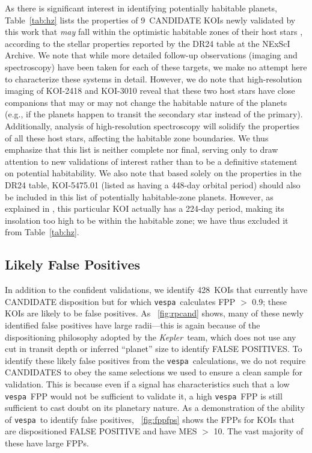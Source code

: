 \documentclass{emulateapj}
\newcommand{\figref}[1]{\ref{fig:#1}}
\newcommand{\Fig}[1]{\figurename~\figref{#1}}
\newcommand{\Tab}[1]{Table~\ref{tab:#1}}
\newcommand{\tab}[1]{\Tab{#1}}
\newcommand{\nfpnew}{428}  %
\newcommand{\nhz}{9}
\newcommand{\kepler}{\textit{Kepler}}
\newcommand{\vespa}{\texttt{vespa}}
\begin{document}


As there is significant interest in identifying potentially habitable
planets, \tab{hz} lists the properties of \nhz\ CANDIDATE KOIs newly
validated by this work that \textit{may} fall within the optimistic
habitable zones of their host stars \citep{Kopparapu:2013}, 
according to the stellar
properties reported by the DR24 table at the NExScI Archive.  We note
that while more detailed follow-up observations (imaging and
spectroscopy) have been taken for each of these targets, we make no
attempt here to characterize these systems in detail.  However, 
we do note that high-resolution imaging of KOI-2418 and KOI-3010 reveal
that these two host stars have close companions that may or may not
change the habitable nature of the planets (e.g., if the planets happen
to transit the secondary star instead of the primary).  Additionally, analysis of
high-resolution spectroscopy will solidify the
properties of all these host stars, affecting the habitable zone
boundaries.  We thus emphasize that this list is neither complete nor
final, serving only to draw attention to new validations of 
interest rather than to be a definitive statement on potential 
habitability.  We also note that based solely on the properties in the 
DR24 table, KOI-5475.01 (listed as having a 448-day orbital period) 
should also be included in this list of potentially habitable-zone
planets.  However, as explained in \citet[][Section 5.5.4]{Coughlin:2015},
this particular KOI actually has a 224-day period, making its insolation
too high to be within the habitable zone; we have thus excluded it 
from \tab{hz}.


\subsection{Likely False Positives}

In addition to the confident validations, we identify \nfpnew\ KOIs
that currently have CANDIDATE disposition but for which \vespa\
calculates FPP $>$ 0.9; these KOIs are likely to be false positives.
As \Fig{rpcand} shows, many of these newly identified false positives
have large radii---this is again because of the dispositioning
philosophy adopted by the \kepler\ team, which does not use any cut in
transit depth or inferred ``planet'' size to identify FALSE POSITIVES.
To identify these likely false positives from the \vespa\
calculations, we do not require CANDIDATES to obey the same selections
we used to ensure a clean sample for validation.  This is because even
if a signal has characteristics such that a low \vespa\ FPP would not
be sufficient to validate it, a high \vespa\ FPP is still sufficient
to cast doubt on its planetary nature. As a demonstration of the
ability of \vespa\ to identify false positives, \Fig{fppfps} shows the
FPPs for KOIs that are dispositioned FALSE POSITIVE and have MES $>$
10. The vast majority of these have large FPPs.
\end{document}
